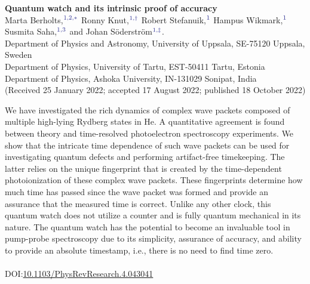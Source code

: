 \documentclass[7pt]{article}
\begin{document}
\newpage
{}   

\begin{center}
    \textbf{\Large{Quantum watch and its intrinsic proof of accuracy}}\\ 
\vspace{0.6cm}
\small{}
Marta Berholts,$^{\textcolor{Blue}{1,2,*}}$ Ronny Knut,$^{\textcolor{Blue}{1,\dag}}$ Robert Stefanuik,$^{\textcolor{Blue}{1}}$ Hampus Wikmark,$^{\textcolor{Blue}{1}}$ Susmita Saha,$^{\textcolor{Blue}{1,3}}$ and Johan Söderström$^{\textcolor{Blue}{1,\ddagger}}$.\\
Department of Physics and Astronomy, University of Uppsala, SE-75120 Uppsala, Sweden\\
Department of Physics, University of Tartu, EST-50411 Tartu, Estonia\\
Department of Physics, Ashoka University, IN-131029 Sonipat, India\\
\vspace{0.6cm}
(Received 25 January 2022; accepted 17 August 2022; published 18 October 2022)
\end{center}

\begin{center}
    \begin{minipage}{15cm}
    \small{}
        We have investigated the rich dynamics of complex wave packets composed of multiple high-lying Rydberg states in He. A quantitative agreement is found between theory and time-resolved photoelectron spectroscopy experiments. We show that the intricate time dependence of such wave packets can be used for investigating quantum defects and performing artifact-free timekeeping. The latter relies on the unique fingerprint that is created by the time-dependent photoionization of these complex wave packets. These fingerprints determine how much time has passed since the wave packet was formed and provide an assurance that the measured time is correct. Unlike any other clock, this quantum watch does not utilize a counter and is fully quantum mechanical in its nature. The quantum watch has the potential to become an invaluable tool in pump-probe spectroscopy due to its simplicity, assurance of accuracy, and ability to provide an absolute timestamp, i.e., there is no need to find time zero.\\ \\
    DOI:\textcolor{Blue}{\url{10.1103/PhysRevResearch.4.043041}}
    \end{minipage}
\end{center}
\hfill
\end{document}
